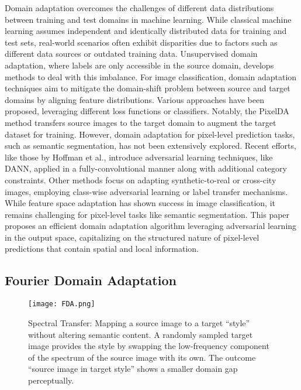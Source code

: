 \documentclass[10pt,twocolumn,letterpaper]{article}
\begin{document}
Domain adaptation overcomes the challenges of different data distributions between training and test domains in machine learning. While classical machine learning assumes independent and identically distributed data for training and test sets, real-world scenarios often exhibit disparities due to factors such as different data sources or outdated training data. Unsupervised domain adaptation, where labels are only accessible in the source domain, develops methods to deal with this imbalance.\cite{DomAd}
For image classification, domain adaptation techniques aim to mitigate the domain-shift problem between source and target domains by aligning feature distributions. Various approaches have been proposed, leveraging different loss functions or classifiers. Notably, the PixelDA method transfers source images to the target domain to augment the target dataset for training.
However, domain adaptation for pixel-level prediction tasks, such as semantic segmentation, has not been extensively explored. Recent efforts, like those by Hoffman et al., introduce adversarial learning techniques, like DANN, applied in a fully-convolutional manner along with additional category constraints. Other methods focus on adapting synthetic-to-real or cross-city images, employing class-wise adversarial learning or label transfer mechanisms.
While feature space adaptation has shown success in image classification, it remains challenging for pixel-level tasks like semantic segmentation. This paper proposes an efficient domain adaptation algorithm leveraging adversarial learning in the output space, capitalizing on the structured nature of pixel-level predictions that contain spatial and local information.

\subsection{Fourier Domain Adaptation}

\begin{figure}[t]
  \centering
   \texttt{[image: FDA.png]}
   \caption{Spectral Transfer: Mapping a source image to a target “style” without altering semantic content. A randomly sampled target
image provides the style by swapping the low-frequency component of the spectrum of the source image with its own. The outcome “source
image in target style” shows a smaller domain gap perceptually.
   }
   \label{fig:fda}
\end{figure}
\end{document}
